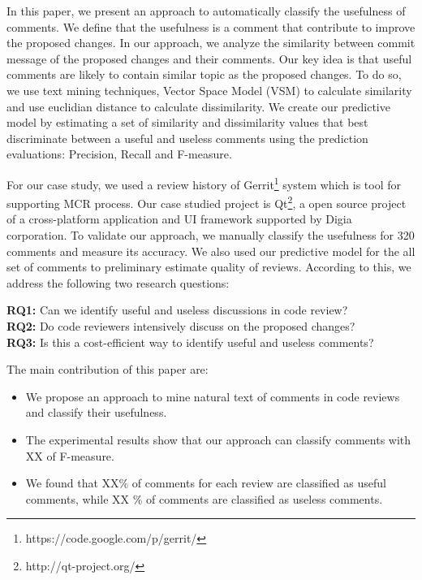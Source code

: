 \documentclass[conference]{IEEEtran}
\begin{document}
In this paper, we present an approach to automatically classify the usefulness of comments. We define that the usefulness is a comment that contribute to improve the proposed changes. In our approach, we analyze the similarity between commit message of the proposed changes and their comments. Our key idea is that useful comments are likely to contain similar topic as the proposed changes. To do so, we use text mining techniques, Vector Space Model (VSM) to calculate similarity and use euclidian distance to calculate dissimilarity. 
We create our predictive model by estimating a set of similarity and dissimilarity values that best discriminate between a useful and useless comments using the prediction evaluations: Precision, Recall and F-measure.

For our case study, we used a review history of Gerrit\footnote{https://code.google.com/p/gerrit/} system which is tool for supporting MCR process. Our case studied project is Qt\footnote{http://qt-project.org/}, a open source project of a cross-platform application and UI framework supported by Digia corporation. To validate our approach, we manually classify the usefulness for 320 comments and measure its accuracy. We also used our predictive model for the all set of comments to preliminary estimate quality of reviews. According to this, we address the following two research questions:

\noindent \textbf{RQ1:} Can we identify useful and useless discussions in code review?\\
\noindent \textbf{RQ2:} Do code reviewers intensively discuss on the proposed changes?\\
\noindent \textbf{RQ3:} Is this a cost-efficient way to identify useful and useless comments?

\noindent The main contribution of this paper are:
\begin{itemize}
\item We propose an approach to mine natural text of comments in code reviews and classify their usefulness.
\item The experimental results show that our approach can classify comments with XX of F-measure.
\item We found that XX\% of comments for each review are classified as useful comments, while XX \% of comments are classified as useless comments.
\end{itemize} 
\end{document}
